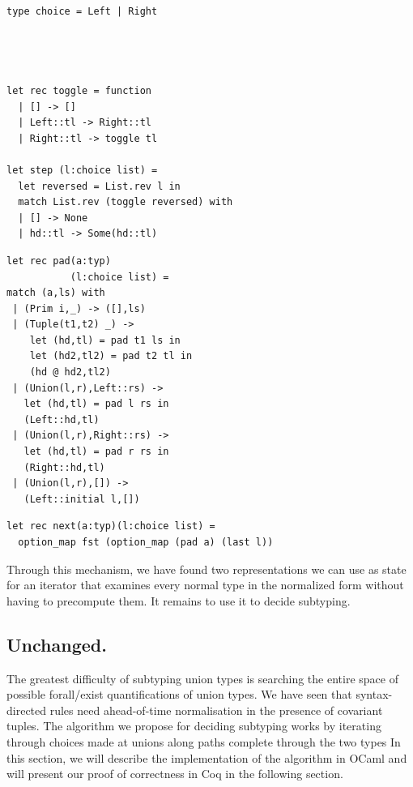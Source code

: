 \documentclass[a4paper,english]{lipics-v2019}
\begin{document}
\noindent
\begin{minipage}{\textwidth}
\begin{minipage}{0.45\textwidth}
\begin{lstlisting}
type choice = Left | Right




let rec toggle = function
  | [] -> []    
  | Left::tl -> Right::tl
  | Right::tl -> toggle tl

let step (l:choice list) =
  let reversed = List.rev l in
  match List.rev (toggle reversed) with
  | [] -> None
  | hd::tl -> Some(hd::tl)
\end{lstlisting}
\end{minipage}
\begin{minipage}{0.5\textwidth}
\begin{lstlisting}
let rec pad(a:typ)
           (l:choice list) = 
match (a,ls) with
 | (Prim i,_) -> ([],ls)
 | (Tuple(t1,t2) _) -> 
    let (hd,tl) = pad t1 ls in
    let (hd2,tl2) = pad t2 tl in
    (hd @ hd2,tl2)
 | (Union(l,r),Left::rs) -> 
   let (hd,tl) = pad l rs in 
   (Left::hd,tl)
 | (Union(l,r),Right::rs) -> 
   let (hd,tl) = pad r rs in 
   (Right::hd,tl)
 | (Union(l,r),[]) -> 
   (Left::initial l,[])
\end{lstlisting}
\end{minipage}

\begin{minipage}{0.96\textwidth}
\begin{lstlisting}
let rec next(a:typ)(l:choice list) =
  option_map fst (option_map (pad a) (last l))
\end{lstlisting}
\end{minipage}
\end{minipage}


Through this mechanism, we have found two representations we can use as state
for an iterator that examines every normal type in the normalized form without
having to precompute them. It remains to use it to decide subtyping.

\subsection{Unchanged.}
The greatest difficulty of subtyping union types is searching the entire
space of possible forall/exist quantifications of union types. We have seen
that syntax-directed rules need ahead-of-time normalisation in the presence
of covariant tuples.  The algorithm we propose for deciding subtyping works
by iterating through choices made at unions along paths complete through the
two types In this section, we will describe the implementation of the
algorithm in OCaml and will present our proof of correctness in Coq in the
following section. 
\end{document}
